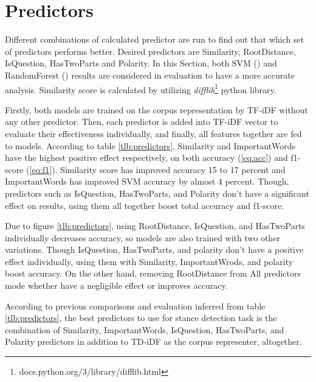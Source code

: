\section{Predictors}
\label{sec:predictors}
Different combinations of calculated predictor are run to find out that which set of predictors performs better. Desired predictors are Similarity, RootDistance, IsQuestion, HasTwoParts and Polarity. In this Section, both SVM (\cite{svc}) and RandomForest (\cite{randomforest}) results are considered in evaluation to have a more accurate analysis. Similarity score is calculated by utilizing \textit{difflib}\footnote{docs.python.org/3/library/difflib.html} python library.


Firstly, both models are trained on the corpus representation by TF-iDF without any other predictor. Then, each predictor is added into TF-iDF vector to evaluate their effectiveness individually, and finally, all features together are fed to models. According to table \ref{tlb:predictors}, Similarity and ImportantWords have the highest positive effect respectively, on both accuracy (\ref{eq:acc}) and f1-score (\ref{eq:f1}). Similarity score has improved accuracy 15 to 17 percent and ImportantWords has improved SVM accuracy by almost 4 percent. Though, predictors such as IsQuestion, HasTwoParts, and Polarity don't have a significant effect on results, using them all together boost total accuracy and f1-score. 

Due to figure \ref{tlb:predictors}, using RootDistance, IsQuestion, and HasTwoParts individually decreases accuracy, so models are also trained with two other variations. Though IsQuestion, HasTwoParts, and polarity don't have a positive effect individually, using them with Similarity, ImportantWrods, and polarity boost accuracy. On the other hand, removing RootDistance from All predictors mode whether have a negligible effect or improves accuracy. 

According to previous comparisons and evaluation inferred from table \ref{tlb:predictors}, the best predictors to use for stance detection task is the combination of Similarity, ImportantWords, IsQuestion, HasTwoParts, and Polarity predictors in addition to TD-iDF as the corpus representer, altogether.

